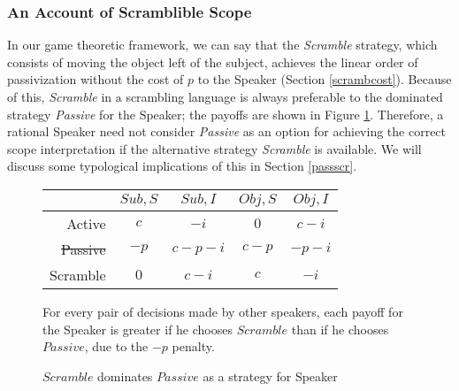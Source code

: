 \documentclass{article}
\begin{document}
\subsubsection{An Account of Scramblible Scope\label{scbad}}

In our game theoretic framework, we can say that the \emph{Scramble} strategy, which consists of moving the object left of the subject, achieves the linear order of passivization without the cost of $p$ to the Speaker (Section \ref{scrambcost}).
	Because of this, \emph{Scramble} in a scrambling language is always preferable to the dominated strategy \emph{Passive} for the Speaker; the payoffs are shown in Figure \ref{dom}.
	Therefore, a rational Speaker need not consider \textit{Passive} as an option for achieving the correct scope interpretation if the alternative strategy \textit{Scramble} is available.
	We will discuss some typological implications of this in Section \ref{passscr}.

\begin{figure}
	\begin{shaded}
\begin{center}
\begin{tabular}{r|cccc}
	&$Sub, S$ & $Sub, I$ & $Obj, S$ & $Obj, I$ \\\hline\hline
Active & $c$  & $-i$ & $0$  & $c-i$ \\
	\sout{Passive} & $-p$ & $c-p-i$  & $c-p$  & $-p-i$  \\
Scramble & $0$  & $c-i$ & $c$  & $-i$  \\
\end{tabular}
\end{center}
\small For every pair of decisions made by other speakers, each payoff for the Speaker is greater if he chooses $Scramble$ than if he chooses $Passive$, due to the $-p$ penalty.
		\caption{$Scramble$ dominates $Passive$ as a strategy for Speaker\label{dom}}
	\end{shaded}
\end{figure}
\end{document}
